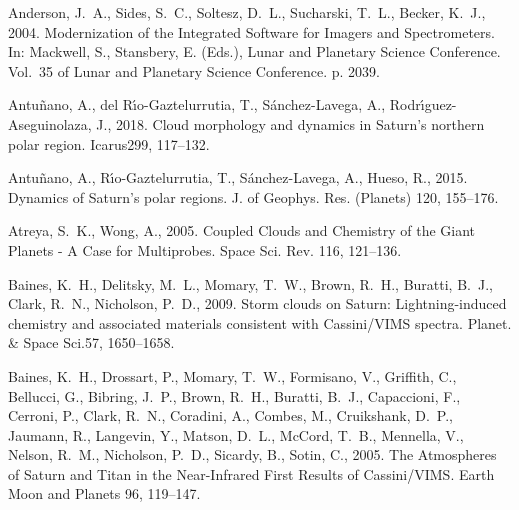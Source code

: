 \documentclass[article,11pt]{emulateapj}
\def\planss{Planet. \& Space Sci.}
\def\icarus{Icarus}
\begin{document}
\begin{thebibliography}{85}
{Anderson}, J.~A., {Sides}, S.~C., {Soltesz}, D.~L., {Sucharski}, T.~L.,
  {Becker}, K.~J., 2004. {Modernization of the Integrated Software for Imagers
  and Spectrometers}. In: {Mackwell}, S., {Stansbery}, E. (Eds.), Lunar and
  Planetary Science Conference. Vol.~35 of Lunar and Planetary Science
  Conference. p. 2039.

{Antu{\~n}ano}, A., {del R{\'\i}o-Gaztelurrutia}, T., {S{\'a}nchez-Lavega}, A.,
  {Rodr{\'\i}guez-Aseguinolaza}, J., 2018. {Cloud morphology and dynamics in
  Saturn's northern polar region}. \icarus 299, 117--132.

{Antu{\~n}ano}, A., {R{\'{\i}}o-Gaztelurrutia}, T., {S{\'a}nchez-Lavega}, A.,
  {Hueso}, R., 2015. {Dynamics of Saturn's polar regions}. J. of Geophys. Res.
  (Planets) 120, 155--176.

{Atreya}, S.~K., {Wong}, A., 2005. {Coupled Clouds and Chemistry of the Giant
  Planets - A Case for Multiprobes}. Space Sci. Rev. 116, 121--136.

{Baines}, K.~H., {Delitsky}, M.~L., {Momary}, T.~W., {Brown}, R.~H., {Buratti},
  B.~J., {Clark}, R.~N., {Nicholson}, P.~D., 2009{}. {Storm clouds
  on Saturn: Lightning-induced chemistry and associated materials consistent
  with Cassini/VIMS spectra}. \planss 57, 1650--1658.

{Baines}, K.~H., {Drossart}, P., {Momary}, T.~W., {Formisano}, V., {Griffith},
  C., {Bellucci}, G., {Bibring}, J.~P., {Brown}, R.~H., {Buratti}, B.~J.,
  {Capaccioni}, F., {Cerroni}, P., {Clark}, R.~N., {Coradini}, A., {Combes},
  M., {Cruikshank}, D.~P., {Jaumann}, R., {Langevin}, Y., {Matson}, D.~L.,
  {McCord}, T.~B., {Mennella}, V., {Nelson}, R.~M., {Nicholson}, P.~D.,
  {Sicardy}, B., {Sotin}, C., 2005. {The Atmospheres of Saturn and Titan in the
  Near-Infrared First Results of Cassini/VIMS}. Earth Moon and Planets 96,
  119--147.


\end{thebibliography}
\end{document}
